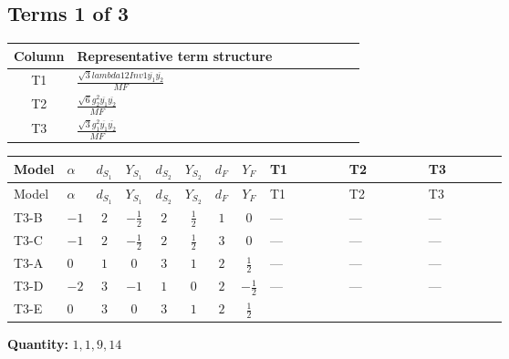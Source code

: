 \documentclass[8pt]{article}
\begin{document}
\begin{landscape}
\subsection*{Terms 1 of 3}
\begin{center}
\begin{tabular}{@{}c >{\raggedright\arraybackslash}p{0.82\linewidth}@{}}
\toprule
Column & Representative term structure \\
\midrule
T1 & \(\displaystyle \frac{\sqrt{3} lambda12Inv1 \overline{y_{1}} \overline{y_{2}}}{MF}\) \\
\midrule
T2 & \(\displaystyle \frac{\sqrt{6} g_{2}^{2} \overline{y_{1}} \overline{y_{2}}}{MF}\) \\
\midrule
T3 & \(\displaystyle \frac{\sqrt{3} g_{1}^{2} \overline{y_{1}} \overline{y_{2}}}{MF}\) \\
\midrule
\bottomrule
\end{tabular}
\end{center}
\smallskip
\tiny
\begin{longtable}{@{}llcccccc >{\raggedright\arraybackslash}p{0.21\linewidth} >{\raggedright\arraybackslash}p{0.21\linewidth} >{\raggedright\arraybackslash}p{0.21\linewidth}@{}}
\toprule
Model & $\alpha$ & $d_{S_1}$ & $Y_{S_1}$ & $d_{S_2}$ & $Y_{S_2}$ & $d_F$ & $Y_F$ & T1 & T2 & T3 \\
\midrule
\endfirsthead
\toprule
Model & $\alpha$ & $d_{S_1}$ & $Y_{S_1}$ & $d_{S_2}$ & $Y_{S_2}$ & $d_F$ & $Y_F$ & T1 & T2 & T3 \\
\midrule
\endhead
T3-B & $-1$ & $2$ & $-\frac{1}{2}$ & $2$ & $\frac{1}{2}$ & $1$ & $0$ & --- & --- & --- \\
\midrule
T3-C & $-1$ & $2$ & $-\frac{1}{2}$ & $2$ & $\frac{1}{2}$ & $3$ & $0$ & --- & --- & --- \\
\midrule
T3-A & $0$ & $1$ & $0$ & $3$ & $1$ & $2$ & $\frac{1}{2}$ & --- & --- & --- \\
\midrule
T3-D & $-2$ & $3$ & $-1$ & $1$ & $0$ & $2$ & $-\frac{1}{2}$ & --- & --- & --- \\
\midrule
T3-E & $0$ & $3$ & $0$ & $3$ & $1$ & $2$ & $\frac{1}{2}$ & \scriptsize\adjustbox{max width=\linewidth}{$\begin{gathered} - \frac{\sqrt{3} lambda12Inv1 \overline{y_{1}} \overline{y_{2}}}{6 MF}\end{gathered}$} & \scriptsize\adjustbox{max width=\linewidth}{$\begin{gathered} \frac{\sqrt{6} g_{2}^{2} \overline{y_{1}} \overline{y_{2}}}{3 MF}\end{gathered}$} & \scriptsize\adjustbox{max width=\linewidth}{$\begin{gathered} \frac{\sqrt{3} g_{1}^{2} \overline{y_{1}} \overline{y_{2}}}{8 MF}\end{gathered}$} \\
\midrule
\bottomrule
\end{longtable}
\clearpage
\noindent\textbf{Quantity: }$\mathrm{1,1,9,14}$\par\smallskip

\end{landscape}
\end{document}
